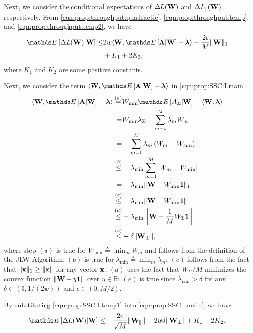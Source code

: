 \documentclass[10pt, conference, letterpaper]{IEEEtran} %
\begin{document}
\begin{IEEEproof}
Next, we consider the conditional expectations of $\Delta L(\mathbf{W})$ and $\Delta L_{\parallel}(\mathbf{W})$, respectively. From \eqref{eqn:prop:throughput:quadractic}, \eqref{eqn:prop:throughput:temp}, and \eqref{eqn:prop:throughput:temp2}, we have
\begin{align}
\label{eqn:prop:SSC:Lmain}
\bE\left[\Delta L(\mb{W})\middle|\mb{W}\right]
\leq&2w\langle\mb{W},\bE\left[\mb{A}\middle|\mb{W}\right]-\bs{\lambda}\rangle -\frac{2\epsilon}{M}\|\mb{W}\|_{1} \nonumber\\
& + K_1 + 2K_2 ,
\end{align}
where $K_1$ and $K_2$ are some positive constants.

Next, we consider the term $\langle\mb{W},\bE\left[\mb{A}\middle|\mb{W}\right]-\bs{\lambda}\rangle$ in \eqref{eqn:prop:SSC:Lmain}.
\begin{align}
\label{eqn:prop:SSC:Ltemp1}
\langle\mb{W},\bE\left[\mb{A}\middle|\mb{W}\right]-\bs{\lambda}\rangle\stackrel{(a)}{=}& W_{\min}\bE\left[A_{\Sigma}\middle|\mb{W}\right]-\langle\mb{W},\bs{\lambda}\rangle \nonumber\\
=&W_{\min}\lambda_{\Sigma}-\sum_{m=1}^{M}\lambda_mW_m \nonumber\\
=&-\sum_{m=1}^{M}\lambda_m\left(W_m - W_{\min}\right)\nonumber\\
\stackrel{(b)}{\leq}&-\lambda_{\min}\sum_{m=1}^{M}|W_m-W_{\min}| \nonumber\\
=&-\lambda_{\min}\|\mb{W}-W_{\min}\mb{1}\|_{1} \nonumber\\
\stackrel{(c)}{\leq}&-\lambda_{\min}\|\mb{W}-W_{\min}\mb{1}\| \nonumber\\
\stackrel{(d)}{\leq}&-\lambda_{\min}\left\|\mb{W}-\frac{1}{M}W_{\Sigma}\mb{1}\right\|\nonumber\\
\stackrel{(e)}{\leq}&-\delta\|\mb{W}_{\perp}\|,
\end{align}
where step $(a)$ is true for $W_{\min}\triangleq\min_{m}W_m$ and follows from the definition of the JLW Algorithm; $(b)$ is true for $\lambda_{\min}\triangleq\min_{m}\lambda_m$; $(c)$ follows from the fact that $\|\mathbf{x}\|_{1}\geq\|\mathbf{x}\|$ for any vector $\mathbf{x}$; $(d)$ uses the fact that $W_{\Sigma}/M$ minimizes the convex function $\|\mathbf{W}-y\mathbf{1}\|$ over $y\in\mathbb{R}$; $(e)$ is true since $\lambda_{\min}>\delta$ for any $\delta\in(0,1/(2w))$ and $\epsilon\in(0,M/2)$.

By substituting \eqref{eqn:prop:SSC:Ltemp1} into \eqref{eqn:prop:SSC:Lmain}, we have 
\begin{align}
\label{eqn:prop:SSC:Lmain:final}
\bE\left[\Delta L(\mb{W})\middle|\mb{W}\right]\leq-\frac{2\epsilon}{\sqrt{M}}\|\mb{W}_{\parallel}\|-2w\delta\|\mb{W}_{\perp}\|+K_1 + 2K_2.
\end{align}


\end{IEEEproof}
\end{document}

